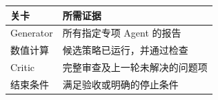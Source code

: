 \begin{tabular}{@{}P{4.0cm}P{8.5cm}@{}}
\toprule
\textbf{关卡} & \textbf{所需证据} \\
\midrule
Generator & 所有指定专项 Agent 的报告 \\
数值计算 & 候选策略已运行，并通过检查 \\
Critic & 完整审查及上一轮未解决的问题项 \\
结束条件 & 满足验收或明确的停止条件 \\
\bottomrule
\end{tabular}
